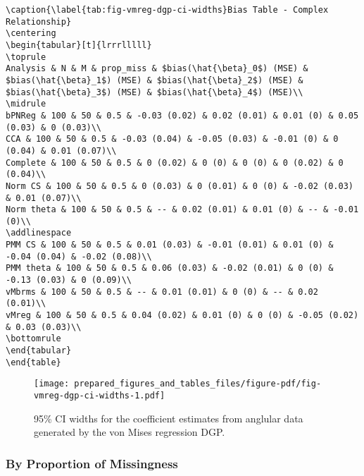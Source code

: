 \documentclass[
]{article}
\begin{document}
\begin{verbatim}
\caption{\label{tab:fig-vmreg-dgp-ci-widths}Bias Table - Complex Relationship}
\centering
\begin{tabular}[t]{lrrrlllll}
\toprule
Analysis & N & M & prop_miss & $bias(\hat{\beta}_0$) (MSE) & $bias(\hat{\beta}_1$) (MSE) & $bias(\hat{\beta}_2$) (MSE) & $bias(\hat{\beta}_3$) (MSE) & $bias(\hat{\beta}_4$) (MSE)\\
\midrule
bPNReg & 100 & 50 & 0.5 & -0.03 (0.02) & 0.02 (0.01) & 0.01 (0) & 0.05 (0.03) & 0 (0.03)\\
CCA & 100 & 50 & 0.5 & -0.03 (0.04) & -0.05 (0.03) & -0.01 (0) & 0 (0.04) & 0.01 (0.07)\\
Complete & 100 & 50 & 0.5 & 0 (0.02) & 0 (0) & 0 (0) & 0 (0.02) & 0 (0.04)\\
Norm CS & 100 & 50 & 0.5 & 0 (0.03) & 0 (0.01) & 0 (0) & -0.02 (0.03) & 0.01 (0.07)\\
Norm theta & 100 & 50 & 0.5 & -- & 0.02 (0.01) & 0.01 (0) & -- & -0.01 (0)\\
\addlinespace
PMM CS & 100 & 50 & 0.5 & 0.01 (0.03) & -0.01 (0.01) & 0.01 (0) & -0.04 (0.04) & -0.02 (0.08)\\
PMM theta & 100 & 50 & 0.5 & 0.06 (0.03) & -0.02 (0.01) & 0 (0) & -0.13 (0.03) & 0 (0.09)\\
vMbrms & 100 & 50 & 0.5 & -- & 0.01 (0.01) & 0 (0) & -- & 0.02 (0.01)\\
vMreg & 100 & 50 & 0.5 & 0.04 (0.02) & 0.01 (0) & 0 (0) & -0.05 (0.02) & 0.03 (0.03)\\
\bottomrule
\end{tabular}
\end{table}
\end{verbatim}

\begin{figure}

{\centering \texttt{[image: prepared\_figures\_and\_tables\_files/figure-pdf/fig-vmreg-dgp-ci-widths-1.pdf]}

}

\caption{\label{fig-vmreg-dgp-ci-widths}95\% CI widths for the
coefficient estimates from anglular data generated by the von Mises
regression DGP.}

\end{figure}

\hypertarget{by-proportion-of-missingness}{%
\subsubsection{By Proportion of
Missingness}\label{by-proportion-of-missingness}}
\end{document}
